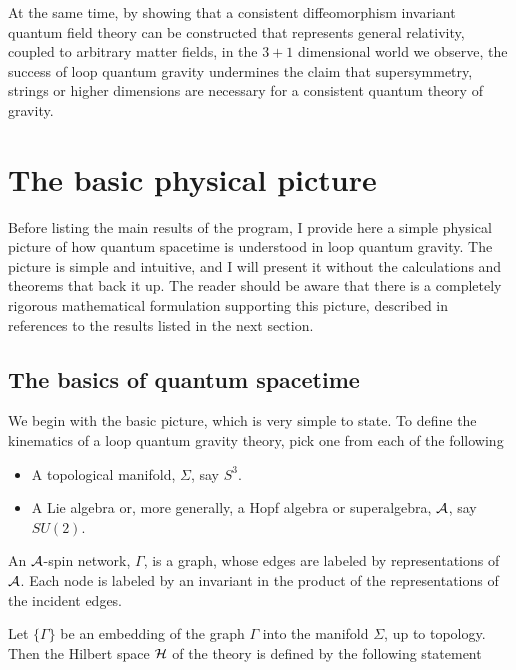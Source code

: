\documentclass[12pt]{article}
\begin{document}
  At the same time, by showing that a consistent diffeomorphism 
  invariant quantum field theory can be constructed that represents 
  general relativity, coupled to arbitrary matter fields, in the 
  $3+1$ dimensional world we observe, the success of loop quantum 
  gravity undermines the claim that supersymmetry, strings or higher dimensions 
  are necessary for a consistent quantum theory of gravity. 
    
 

\section{The basic physical picture}

Before listing the main results of the program, I provide here a simple 
physical picture of how quantum spacetime is understood in loop quantum gravity.
The picture is simple and intuitive, and I will present it without 
the calculations and theorems that back it up. The reader should be 
aware that there is a completely rigorous mathematical formulation supporting this
picture, described in references to the results listed in the next section.  

\subsection{The basics of quantum spacetime}

We begin with the basic picture, which is very simple to state.  To define
the kinematics of a loop quantum gravity theory, pick one from each of the following

\begin{itemize}

\item{}A topological manifold, $\Sigma$, say  $S^3$.  

\item{}A Lie algebra or, more generally, a Hopf algebra or superalgebra, $\cal A$,
say $SU(2)$. 

\end{itemize}

An $\cal A$-spin network, $\Gamma$,  is a graph, whose edges are labeled
by representations of $\cal A$. Each node is labeled by an invariant
in the product of the representations of the incident edges.  

Let $\{ \Gamma \}$ be an embedding of the graph $\Gamma$ into the
manifold $\Sigma$, up to topology.  
Then the Hilbert space ${\cal H}$ of the theory
is defined by the following statement
\end{document}
